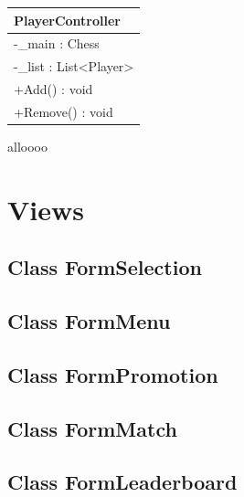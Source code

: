 \documentclass[12pt]{article}
\begin{document}
\begin{table}[H]
    \begin{tabular}{|l|}
    \hline
    \rowcolor[HTML]{C0C0C0} 
    \textbf{PlayerController}                       \\ \hline
    \rowcolor[HTML]{EFEFEF} 
    -\_main : Chess                               \\ \hline
    \rowcolor[HTML]{EFEFEF} 
    -\_list : List\textless{}Player\textgreater{} \\ \hline
    \rowcolor[HTML]{FFFFFF} 
    +Add() : void                                 \\ \hline
    \rowcolor[HTML]{FFFFFF} 
    +Remove() : void                              \\ \hline
    \end{tabular}
    \end{table}

\newpage
alloooo

\section{Views}


\subsection{Class FormSelection}
\newpage


\subsection{Class FormMenu}
\newpage


\subsection{Class FormPromotion}
\newpage


\subsection{Class FormMatch}
\newpage


\subsection{Class FormLeaderboard}
\newpage
\end{document}
